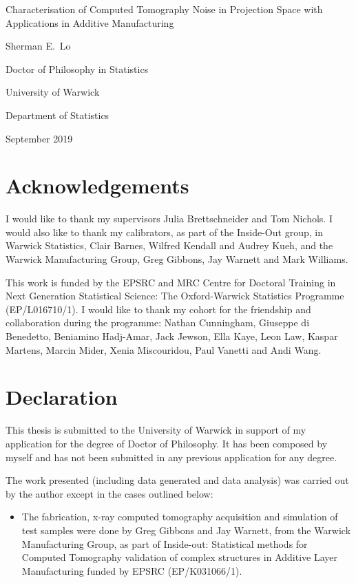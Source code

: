 \documentclass[12pt, a4paper]{memoir}
\begin{document}
\sloppy

\begin{titlingpage}
\centering
{\LARGE Characterisation of Computed Tomography Noise in Projection Space with Applications in Additive Manufacturing \par}
\vspace{1cm}
{\Large Sherman E.~Lo\par}
{\Large Doctor of Philosophy in Statistics\par}
\vfill
{\Large University of Warwick\par}
{\Large Department of Statistics\par}
{\Large September 2019\par}
\end{titlingpage}


\frontmatter

\newpage
\tableofcontents*
\newpage
\listoffigures
\newpage
\listoftables

\chapter{Acknowledgements}
I would like to thank my supervisors Julia Brettschneider and Tom Nichols. I would also like to thank my calibrators, as part of the Inside-Out group, in Warwick Statistics, Clair Barnes, Wilfred Kendall and Audrey Kueh, and the Warwick Manufacturing Group, Greg Gibbons, Jay Warnett and Mark Williams.

This work is funded by the EPSRC and MRC Centre for Doctoral Training in Next Generation Statistical Science: The Oxford-Warwick Statistics Programme (EP/L016710/1). I would like to thank my cohort for the friendship and collaboration during the programme: Nathan Cunningham, Giuseppe di Benedetto, Beniamino Hadj-Amar, Jack Jewson, Ella Kaye, Leon Law, Kaspar Martens, Marcin Mider, Xenia Miscouridou, Paul Vanetti and Andi Wang.

\chapter{Declaration}
This thesis is submitted to the University of Warwick in support of my application for the degree of Doctor of Philosophy. It has been composed by myself and has not been submitted in any previous application for any degree.

The work presented (including data generated and data analysis) was carried out by the author except in the cases outlined below:
\begin{itemize}
  \item The fabrication, x-ray computed tomography acquisition and simulation of test samples were done by Greg Gibbons and Jay Warnett, from the Warwick Manufacturing Group, as part of Inside-out: Statistical methods for Computed Tomography validation of complex structures in Additive Layer Manufacturing funded by EPSRC (EP/K031066/1).
\end{itemize}
\end{document}
